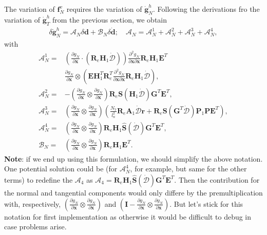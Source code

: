 \documentclass[3p]{elsarticle}
\newcommand{\vect}[1]{\boldsymbol{#1}}
\begin{document}
The variation of $\vect{f}_N^v$ requires the variation of $\dot{\vect{g}}_N^h$. Following the derivations fro the variation of $\dot{\vect{g}}_T^h$ from the previous section, we obtain
\begin{align}
	\delta\dot{\vect{g}}_N^h=\vect{\mathcal{A}}_N\delta\vect{d}+\vect{\mathcal{B}}_N\delta\dot{\vect{d}};\quad\vect{\mathcal{A}}_N=\vect{\mathcal{A}}_N^1+\vect{\mathcal{A}}_N^2+\vect{\mathcal{A}}_N^3+\vect{\mathcal{A}}_N^4\label{eq:deltagdotN},
\end{align}
\noindent with
\begin{subequations}
	\begin{align}
		\vect{\mathcal{A}}_N^1=&\left(\frac{\partial g_N}{\partial\vect{x}}\cdot(\vect{R}_e\vect{H}_1\dot{\vect{\mathcal{D}}})\right)\frac{\partial^2 g_N}{\partial\vect{x}\partial\vect{x}}\vect{R}_e\vect{H}_1\vect{E}^T\nonumber\\
		&\frac{\partial g_N }{\partial\vect{x}}\otimes\left(\vect{E}\vect{H}_1^T\vect{R}_e^T\frac{\partial^2 g_N}{\partial\vect{x}\partial\vect{x}}\vect{R}_e\vect{H}_1\dot{\vect{\mathcal{D}}}\right),\\
		\vect{\mathcal{A}}_N^2=&-\left(\frac{\partial g_N}{\partial\vect{x}}\otimes\frac{\partial g_N}{\partial\vect{x}}\right)\vect{R}_e\vect{S}(\vect{H}_1\dot{\vect{\mathcal{D}}})\vect{G}^T\vect{E}^T,\\
		\vect{\mathcal{A}}_N^3=&\left(\frac{\partial g_N}{\partial\vect{x}}\otimes\frac{\partial g_N}{\partial\vect{x}}\right)\left(\frac{N_7}{l_n^2}\vect{R}_e\vect{A}_1\dot{\vect{\mathcal{D}}}\vect{r}+\vect{R}_e\vect{S}(\vect{G}^T\dot{\vect{\mathcal{D}}})\vect{P}_1\vect{P}\vect{E}^T\right),\\
		\vect{\mathcal{A}}_N^4=&\left(\frac{\partial g_N}{\partial\vect{x}}\otimes\frac{\partial g_N}{\partial\vect{x}}\right)\vect{R}_e\vect{H}_1\hat{\vect{S}}(\dot{\vect{\mathcal{D}}})\vect{G}^T\vect{E}^T,\\
		\vect{\mathcal{B}}_N=&\left(\frac{\partial g_N}{\partial\vect{x}}\otimes\frac{\partial g_N}{\partial\vect{x}}\right)\vect{R}_e\vect{H}_1\vect{E}^T.
	\end{align}
\end{subequations}
\noindent\textbf{Note}: if we end up using this formulation, we should simplify the above notation. One potential solution could be (for $\vect{\mathcal{A}}_N^4$, for example, but same for the other terms) to redefine the $\vect{\mathcal{A}}_4$ as $\vect{\mathcal{A}}_4=\vect{R}_e\vect{H}_1\hat{\vect{S}}(\dot{\vect{\mathcal{D}}})\vect{G}^T\vect{E}^T$. Then the contribution for the normal and tangential components would only differe by the premultiplication with, respectively, $\left(\frac{\partial g_N}{\partial\vect{x}}\otimes\frac{\partial g_N}{\partial\vect{x}}\right)$ and $\left(\vect{I}-\frac{\partial g_N}{\partial\vect{x}}\otimes\frac{\partial g_N}{\partial\vect{x}}\right)$. But let's stick for this notation for first implementation as otherwise it would be difficult to debug in case problems arise.
\end{document}
